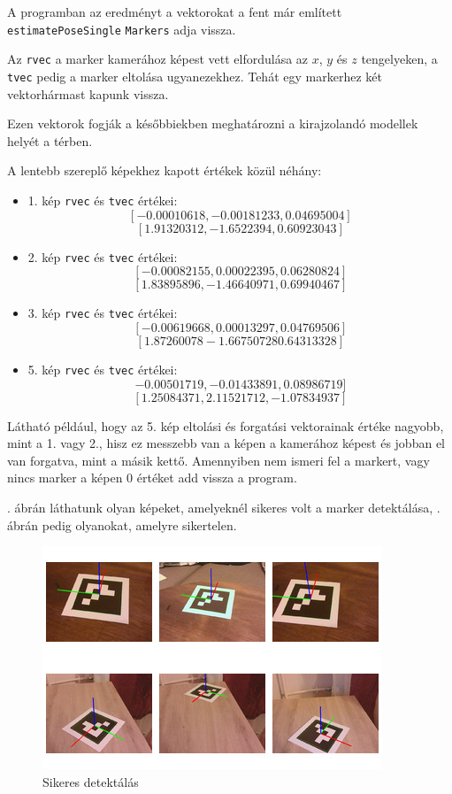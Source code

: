 A programban az eredményt a vektorokat a fent már említett \texttt{estimatePoseSingle} \texttt{Markers} adja vissza.

Az \texttt{rvec} a marker kamerához képest vett elfordulása az $x$, $y$ és $z$ tengelyeken, a \texttt{tvec} pedig a marker eltolása ugyanezekhez. Tehát egy markerhez két vektorhármast kapunk vissza.

Ezen vektorok fogják a későbbiekben meghatározni a kirajzolandó modellek helyét a térben.

A lentebb szereplő képekhez kapott értékek közül néhány:
\begin{itemize}
\item 1. kép \texttt{rvec} és \texttt{tvec} értékei:
\[[-0.00010618, -0.00181233, 0.04695004]\]
\[[ 1.91320312, -1.6522394,  0.60923043]\]
\item 2. kép \texttt{rvec} és \texttt{tvec} értékei:
\[[-0.00082155,  0.00022395,  0.06280824]\]
\[[ 1.83895896, -1.46640971,  0.69940467]\]
\item 3. kép \texttt{rvec} és \texttt{tvec} értékei:
\[[-0.00619668, 0.00013297,  0.04769506]\]
\[[ 1.87260078 -1.66750728  0.64313328]\]
\item 5. kép \texttt{rvec} és \texttt{tvec} értékei:
\[-0.00501719, -0.01433891,  0.08986719]\]
\[[ 1.25084371,  2.11521712, -1.07834937]\]
\end{itemize}

Látható például, hogy az 5. kép eltolási és forgatási vektorainak értéke nagyobb, mint a 1. vagy 2., hisz ez messzebb van a képen a kamerához képest és jobban el van forgatva, mint a másik kettő.
Amennyiben nem ismeri fel a markert, vagy nincs marker a képen 0 értéket add vissza a program.

. ábrán láthatunk olyan képeket, amelyeknél sikeres volt a marker detektálása, . ábrán pedig olyanokat, amelyre sikertelen.

\begin{figure}[htp]
    \centering
   	\includegraphics[width=\textwidth]{images/detect.jpg}
	\caption{Sikeres detektálás}
	\label{fig:detect}
\end{figure}

